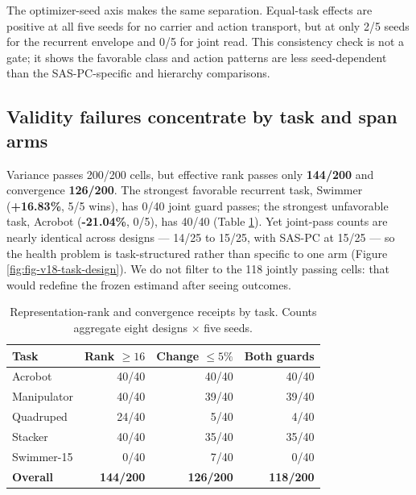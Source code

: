 The optimizer-seed axis makes the same separation. Equal-task effects
are positive at all five seeds for no carrier and action transport, but
at only 2/5 seeds for the recurrent envelope and 0/5 for joint read.
This consistency check is not a gate; it shows the favorable class and
action patterns are less seed-dependent than the SAS-PC-specific and
hierarchy comparisons.

\subsection{Validity failures concentrate by task and span
arms}\label{validity-failures-concentrate-by-task-and-span-arms}

Variance passes 200/200 cells, but effective rank passes only
\textbf{144/200} and convergence \textbf{126/200}. The strongest
favorable recurrent task, Swimmer (\textbf{+16.83\%}, 5/5 wins), has
0/40 joint guard passes; the strongest unfavorable task, Acrobot
(\textbf{-21.04\%}, 0/5), has 40/40 (Table \ref{tbl:validity-by-task}).
Yet joint-pass counts are nearly identical across designs --- 14/25 to
15/25, with SAS-PC at 15/25 --- so the health problem is task-structured
rather than specific to one arm (Figure \ref{fig:fig-v18-task-design}).
We do not filter to the 118 jointly passing cells: that would redefine
the frozen estimand after seeing outcomes.

\begin{table}[H]
\centering
\caption{Representation-rank and convergence receipts by task. Counts aggregate eight designs \(\times\) five seeds.}
\label{tbl:validity-by-task}
\small
\setlength{\tabcolsep}{8pt}
\begin{tabular}{@{}lrrr@{}}
\toprule
\textcolor{NVIDIADark}{\textbf{Task}} & \textcolor{NVIDIADark}{\textbf{Rank \(\geq 16\)}} & \textcolor{NVIDIADark}{\textbf{Change \(\leq 5\%\)}} & \textcolor{NVIDIADark}{\textbf{Both guards}} \\
\midrule
Acrobot & 40/40 & 40/40 & 40/40 \\
Manipulator & 40/40 & 39/40 & 39/40 \\
Quadruped & 24/40 & 5/40 & 4/40 \\
Stacker & 40/40 & 35/40 & 35/40 \\
Swimmer-15 & 0/40 & 7/40 & 0/40 \\
\midrule\textbf{Overall} & \textbf{144/200} & \textbf{126/200} & \textbf{118/200} \\
\bottomrule
\end{tabular}
\end{table}

